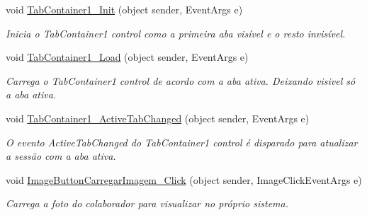 \begin{DoxyCompactItemize}
\item 
void \hyperlink{class_sistema_r_h_1_1_alterar_colaborador_ae0f6697f76be8ce92d7bada3e06b5b62}{TabContainer1\_\-Init} (object sender, EventArgs e)
\begin{DoxyCompactList}\small\item\em Inicia o TabContainer1 control como a primeira aba visível e o resto invisível. \item\end{DoxyCompactList}\item 
void \hyperlink{class_sistema_r_h_1_1_alterar_colaborador_ada871755365a0bbd46d37b627110ec94}{TabContainer1\_\-Load} (object sender, EventArgs e)
\begin{DoxyCompactList}\small\item\em Carrega o TabContainer1 control de acordo com a aba ativa. Deixando visivel só a aba ativa. \item\end{DoxyCompactList}\item 
void \hyperlink{class_sistema_r_h_1_1_alterar_colaborador_a3073c3e27ef78d827df0b01fdfb96774}{TabContainer1\_\-ActiveTabChanged} (object sender, EventArgs e)
\begin{DoxyCompactList}\small\item\em O evento ActiveTabChanged do TabContainer1 control é disparado para atualizar a sessão com a aba ativa. \item\end{DoxyCompactList}\item 
void \hyperlink{class_sistema_r_h_1_1_alterar_colaborador_a9077232e369fde1de3edb112d3d7af98}{ImageButtonCarregarImagem\_\-Click} (object sender, ImageClickEventArgs e)
\begin{DoxyCompactList}\small\item\em Carrega a foto do colaborador para visualizar no próprio sistema. \item\end{DoxyCompactList}\end{DoxyCompactItemize}
